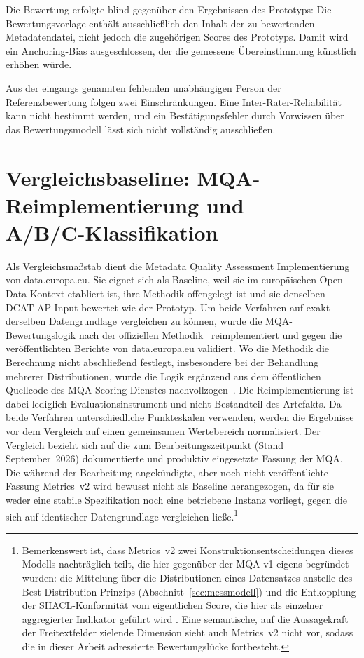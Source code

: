 Die Bewertung erfolgte blind gegenüber den Ergebnissen des Prototyps: Die
Bewertungsvorlage enthält ausschließlich den Inhalt der zu bewertenden Metadatendatei,
nicht jedoch die zugehörigen Scores des Prototyps. Damit wird ein
Anchoring-Bias ausgeschlossen, der die gemessene Übereinstimmung künstlich erhöhen würde.

Aus der eingangs genannten fehlenden unabhängigen Person der Referenzbewertung folgen zwei Einschränkungen. Eine Inter-Rater-Reliabilität kann nicht
bestimmt werden, und ein Bestätigungsfehler durch Vorwissen über das Bewertungsmodell
lässt sich nicht vollständig ausschließen.

\section{Vergleichsbaseline: MQA-Reimplementierung und \\  A/B/C-Klassifikation}
\label{sec:eval_mqa_abc}

Als Vergleichsmaßstab dient die Metadata Quality Assessment Implementierung von data.europa.eu. Sie
eignet sich als Baseline, weil sie im europäischen Open-Data-Kontext etabliert ist,
ihre Methodik offengelegt ist und sie denselben DCAT-AP-Input bewertet wie der Prototyp.
Um beide Verfahren auf exakt derselben Datengrundlage vergleichen zu können, wurde die
MQA-Bewertungslogik nach der offiziellen Methodik~\cite{data_europa}
reimplementiert und gegen die veröffentlichten Berichte von data.europa.eu validiert.
Wo die Methodik die Berechnung nicht abschließend festlegt, insbesondere bei der
Behandlung mehrerer Distributionen, wurde die Logik ergänzend aus dem öffentlichen
Quellcode des MQA-Scoring-Dienstes nachvollzogen~\cite{piveauMetricsScore}.
Die Reimplementierung ist dabei lediglich Evaluationsinstrument und nicht Bestandteil des
Artefakts. Da beide Verfahren unterschiedliche Punkteskalen verwenden, werden die
Ergebnisse vor dem Vergleich auf einen gemeinsamen Wertebereich normalisiert.
Der Vergleich bezieht sich auf die zum Bearbeitungszeitpunkt (Stand September~2026)
dokumentierte und produktiv eingesetzte Fassung der MQA. Die während der Bearbeitung
angekündigte, aber noch nicht veröffentlichte Fassung Metrics~v2 wird bewusst nicht als
Baseline herangezogen, da für sie weder eine stabile Spezifikation noch eine betriebene
Instanz vorliegt, gegen die sich auf identischer Datengrundlage vergleichen ließe.\footnote{%
Bemerkenswert ist, dass Metrics~v2 zwei Konstruktionsentscheidungen dieses Modells nachträglich
teilt, die hier gegenüber der MQA v1 eigens begründet wurden: die Mittelung über die
Distributionen eines Datensatzes anstelle des Best-Distribution-Prinzips
(Abschnitt~\ref{sec:messmodell}) und die Entkopplung der SHACL-Konformität vom eigentlichen
Score, die hier als einzelner aggregierter Indikator geführt wird \cite{piveauMetricsV2}. Eine semantische, auf
die Aussagekraft der Freitextfelder zielende Dimension sieht auch Metrics~v2 nicht vor,
sodass die in dieser Arbeit adressierte Bewertungslücke fortbesteht.}

